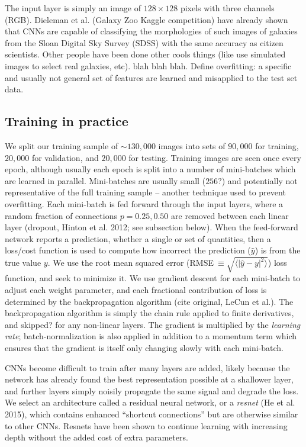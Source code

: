 \documentclass[fleqn,usenatbib]{mnras}
\begin{document}
The input layer is simply an image of $128\times 128$ pixels with three channels (RGB).
Dieleman et al. (Galaxy Zoo Kaggle competition) have already shown that CNNs are capable of classifying the morphologies of such images of galaxies from the Sloan Digital Sky Survey (SDSS) with the same accuracy as citizen scientists.
Other people have been done other cools things (like use simulated images to select real galaxies, etc).
blah blah blah.
Define overfitting: a specific and usually not general set of features are learned and misapplied to the test set data.


\subsection{Training in practice} \label{sec:training}

We split our training sample of $\sim 130,000$ images into sets of $90,000$ for training, $20,000$ for validation, and $20,000$ for testing.
Training images are seen once every epoch, although usually each epoch is split into a number of mini-batches which are learned in parallel.
Mini-batches are usually small ($256?$) and potentially not representative of the full training sample -- another technique used to prevent overfitting.
Each mini-batch is fed forward through the input layers, where a random fraction of connections $p=0.25, 0.50$ are removed between each linear layer (dropout, Hinton et al. 2012; see subsection below).
When the feed-forward network reports a prediction, whether a single or set of quantities, then a loss/cost function is used to compute how incorrect the prediction ($\hat y$) is from the true value $y$.
We use the root mean squared error (RMSE$~\equiv \sqrt{\langle |\hat y - y|^2\rangle}$) loss function, and seek to minimize it.
We use gradient descent for each mini-batch to adjust each weight parameter, and each fractional contribution of loss is determined by the backpropagation algorithm (cite original, LeCun et al.).
The backpropagation algorithm is simply the chain rule applied to finite derivatives, and skipped? for any non-linear layers.
The gradient is multiplied by the \textit{learning rate}; batch-normalization is also applied in addition to a momentum term which ensures that the gradient is itself only changing slowly with each mini-batch.


CNNs become difficult to train after many layers are added, likely because the network has already found the best representation possible at a shallower layer, and further layers simply noisily propagate the same signal and degrade the loss.
We select an architecture called a residual neural network, or a \textit{resnet} (He et al. 2015), which contains enhanced ``shortcut connections'' but are otherwise similar to other CNNs.
Resnets have been shown to continue learning with increasing depth without the added cost of extra parameters.
\end{document}
